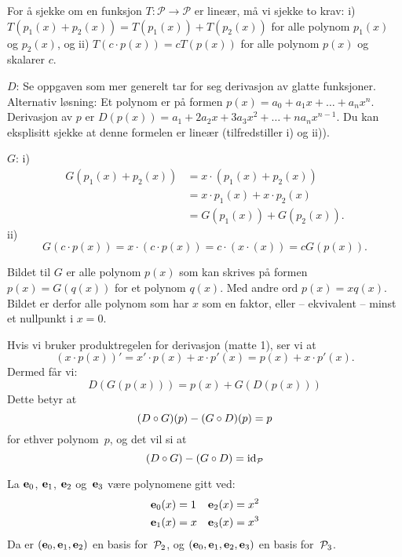 \begin{losning}
\begin{punkt}
For å sjekke om en funksjon $T:\mathcal{P}\rightarrow \mathcal{P}$ er lineær, må vi sjekke to krav: i) $T(p_1(x)+p_2(x))=T(p_1(x))+T(p_2(x))$ for alle polynom $p_1(x)$ og $p_2(x)$, og ii) $T(c\cdot p(x))=cT(p(x))$ for alle polynom $p(x)$ og skalarer $c$.


\noindent
$D$: Se oppgaven som mer generelt tar for seg derivasjon av glatte funksjoner. Alternativ løsning: Et polynom er på formen $p(x)=a_0+a_1x+\dots +a_nx^n$. Derivasjon av $p$ er $D(p(x))=a_1+2a_2x+3a_3x^2+\dots+na_nx^{n-1}$. Du kan eksplisitt sjekke at denne formelen er lineær (tilfredstiller i) og ii)).


\noindent
$G$: i)
\begin{align*}
G(p_1(x)+p_2(x))
&=x\cdot(p_1(x)+p_2(x)) \\
&=x\cdot p_1(x)+x\cdot p_2(x) \\
&=G(p_1(x))+G(p_2(x)).
\end{align*}
ii) $$G(c\cdot p(x))=x\cdot(c\cdot p(x))=c\cdot(x\cdotp(x))=cG(p(x)).$$


\end{punkt}

\begin{punkt}
Bildet til $G$ er alle polynom $p(x)$ som kan skrives på formen $p(x)=G(q(x))$ for et polynom $q(x)$. Med andre ord $p(x)=xq(x)$. Bildet er derfor alle polynom som har $x$ som en faktor, eller -- ekvivalent -- minst et nullpunkt i $x=0$.
\end{punkt}

\begin{punkt}
Hvis vi bruker produktregelen for derivasjon (matte 1), ser vi at 
$$(x\cdot p(x))'=x'\cdot p(x)+x\cdot p'(x)=p(x)+x\cdot p'(x).$$
Dermed får vi:
\[
D(G(p(x)))=p(x)+G(D(p(x)))
\]
Dette betyr at
\[
(D \fcomp G)(p) - (G \fcomp D)(p) = p
\]
for ethver polynom~$p$, og det vil si at
\[
(D \fcomp G) - (G \fcomp D) = \id_{\P}
\]
\end{punkt}

\begin{punkt}
La $\e_0$, $\e_1$, $\e_2$ og~$\e_3$ være polynomene gitt ved:
\begin{align*}
\e_0(x) &= 1 &
\e_2(x) &= x^2 \\
\e_1(x) &= x &
\e_3(x) &= x^3
\end{align*}
Da er $(\e_0, \e_1, \e_2)$ en basis for~$\P_2$, og
$(\e_0, \e_1, \e_2, \e_3)$ en basis for~$\P_3$.


\end{punkt}
\end{losning}
